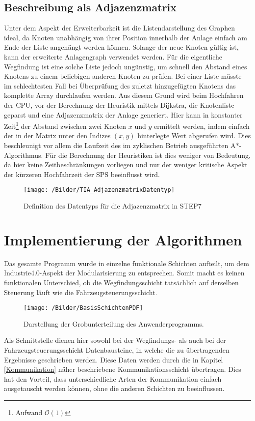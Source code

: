 		\subsection{Beschreibung als Adjazenzmatrix}
			\label{Adjazenzmatrix}
			Unter dem Aspekt der Erweiterbarkeit ist die Listendarstellung des Graphen ideal, da Knoten unabhängig von ihrer Position innerhalb der Anlage einfach am Ende der Liste angehängt werden können. Solange der neue Knoten gültig ist, kann der erweiterte Anlagengraph verwendet werden. Für die eigentliche Wegfindung ist eine solche Liste jedoch ungünstig, um schnell den Abstand eines Knotens zu einem beliebigen anderen Knoten zu prüfen. Bei einer Liste müsste im schlechtesten Fall bei Überprüfung des zuletzt hinzugefügten Knotens das komplette Array durchlaufen werden. Aus diesem Grund wird beim Hochfahren der CPU, vor der Berechnung der Heuristik mittels Dijkstra, die Knotenliste geparst und eine Adjazenzmatrix der Anlage generiert. Hier kann in konstanter Zeit\footnote{Aufwand $\mathcal{O}(1)$} der Abstand zwischen zwei Knoten $x$ und $y$ ermittelt werden, indem einfach der in der Matrix unter den Indizes $(x,y)$ hinterlegte Wert abgerufen wird. Dies beschleunigt vor allem die Laufzeit des im zyklischen Betrieb ausgeführten A*-Algorithmus. Für die Berechnung der Heuristiken ist dies weniger von Bedeutung, da hier keine Zeitbeschränkungen vorliegen und nur der weniger kritische Aspekt der kürzeren Hochfahrzeit der \ac{SPS} beeinflusst wird.
			
			\begin{figure}
				\centering
				\texttt{[image: /Bilder/TIA\_AdjazenzmatrixDatentyp]}
				\vspace{0.2cm}
				\caption{Definition des Datentyps für die Adjazenzmatrix in \ac{STEP7}}
			\end{figure}

	\section{Implementierung der Algorithmen}
		
	
		Das gesamte Programm wurde in einzelne funktionale Schichten aufteilt, um dem Industrie4.0-Aspekt der Modularisierung zu entsprechen. Somit macht es keinen funktionalen Unterschied, ob die Wegfindungsschicht tatsächlich auf derselben Steuerung läuft wie die Fahrzeugsteuerungsschicht.
		\begin{wrapfigure}{r}{5cm}
			\centering
			\texttt{[image: /Bilder/BasisSchichtenPDF]}
			\vspace{0.2cm}
			\caption{Darstellung der Grobunterteilung des Anwenderprogramms.}
		\end{wrapfigure}
		 Als Schnittstelle dienen hier sowohl bei der Wegfindungs- als auch bei der Fahrzeugsteuerungsschicht  Datenbausteine, in welche die zu übertragenden Ergebnisse geschrieben werden. Diese Daten werden durch die in Kapitel \ref{Kommunikation} näher beschriebene Kommunikationsschicht übertragen. Dies hat den Vorteil, dass unterschiedliche Arten der Kommunikation einfach ausgetauscht werden können, ohne die anderen Schichten zu beeinflussen.
		
